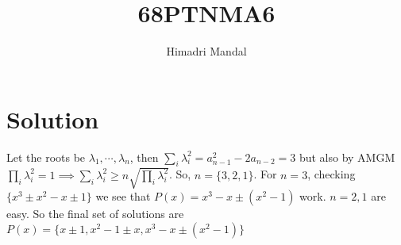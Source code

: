 \documentclass[11pt]{scrartcl}
\title{68PTNMA6}
\author{Himadri Mandal}
\begin{document}
\maketitle

\section{Solution}
\begin{soln}
Let the roots be $\lambda_1,\cdots, \lambda_n$, then $\sum_i \lambda_i^2 = a_{n-1}^2 - 2a_{n-2} = 3$
  but also by AMGM $\prod_i \lambda_i^2 = 1 \implies \sum_i \lambda_i^2 \geq n \sqrt{\prod_i \lambda_i^2}$.
  So, $n = \{3,2,1\}$. For $n = 3$, checking $\{x^3 \pm x^2 -x \pm 1\}$ we see that $P(x) = x^3 -x \pm(x^2 - 1)$ work.
  $n = 2,1$ are easy. So the final set of solutions are $P(x) = \{x \pm 1, x^2 -1 \pm x, x^3 - x \pm(x^2 -1)\}$
\end{soln}
\end{document}
